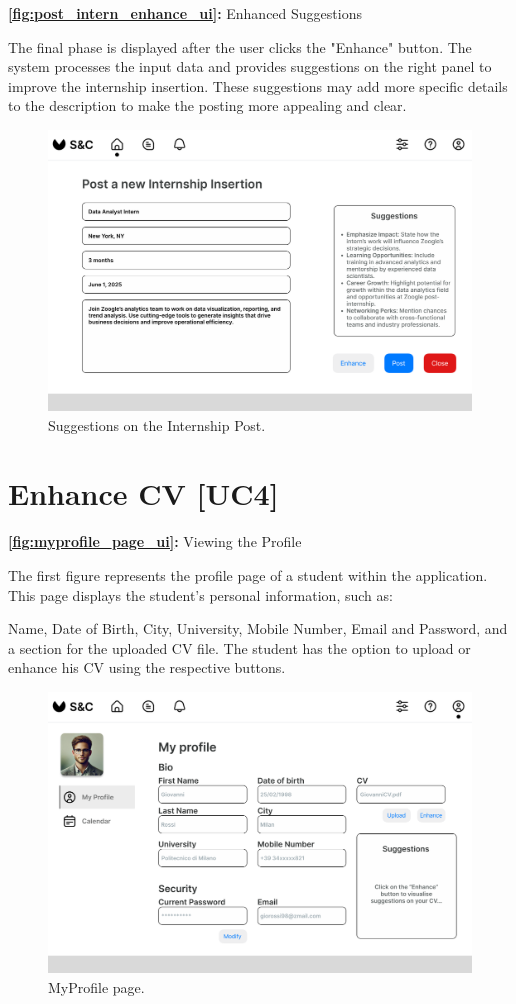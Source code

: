\textbf{\autoref{fig:post_intern_enhance_ui}:} Enhanced Suggestions

The final phase is displayed after the user clicks the "Enhance" button. The system processes the input data and provides suggestions on the right panel to improve the internship insertion. These suggestions may add more specific details to the description to make the posting more appealing and clear.

\begin{figure}[H]
    \centering
    \includegraphics[width=0.75\linewidth]{DD/Images/UI/Postpage_filledForm_enhance.png}
    \caption{Suggestions on the Internship Post.}
    \label{fig:post_intern_enhance_ui}
\end{figure}



\section{Enhance CV [UC4]}
\label{sec:UI3_enhanced_CV}%

\textbf{\autoref{fig:myprofile_page_ui}:} Viewing the Profile

The first figure represents the profile page of a student within the application. This page displays the student's personal information, such as:

Name, Date of Birth, City, University, Mobile Number, Email and Password, and a section for the uploaded CV file.
The student has the option to upload or enhance his CV using the respective buttons.

\begin{figure}[H]
    \centering
    \includegraphics[width=0.75\linewidth]{DD/Images/UI/MyProfile.png}
    \caption{MyProfile page.}
    \label{fig:myprofile_page_ui}
\end{figure}


